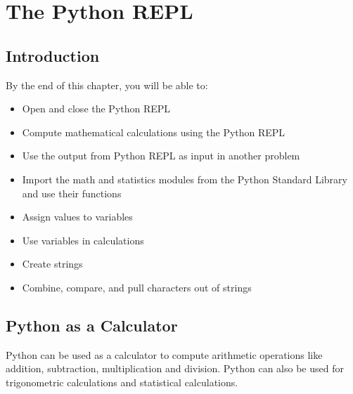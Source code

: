 \documentclass{book}
\begin{document}
    




    
        \chapter{The Python REPL}\label{the-python-repl}
    




    
        \section{Introduction}\label{introduction}
    




    
        By the end of this chapter, you will be able to:

\begin{itemize}
\item
  Open and close the Python REPL
\item
  Compute mathematical calculations using the Python REPL
\item
  Use the output from Python REPL as input in another problem
\item
  Import the math and statistics modules from the Python Standard
  Library and use their functions
\item
  Assign values to variables
\item
  Use variables in calculations
\item
  Create strings
\item
  Combine, compare, and pull characters out of strings
\end{itemize}
        \newpage



    




    
        \section{Python as a Calculator}\label{python-as-a-calculator}
    




    
        Python can be used as a calculator to compute arithmetic operations like
addition, subtraction, multiplication and division. Python can also be
used for trigonometric calculations and statistical calculations.
    
\end{document}

